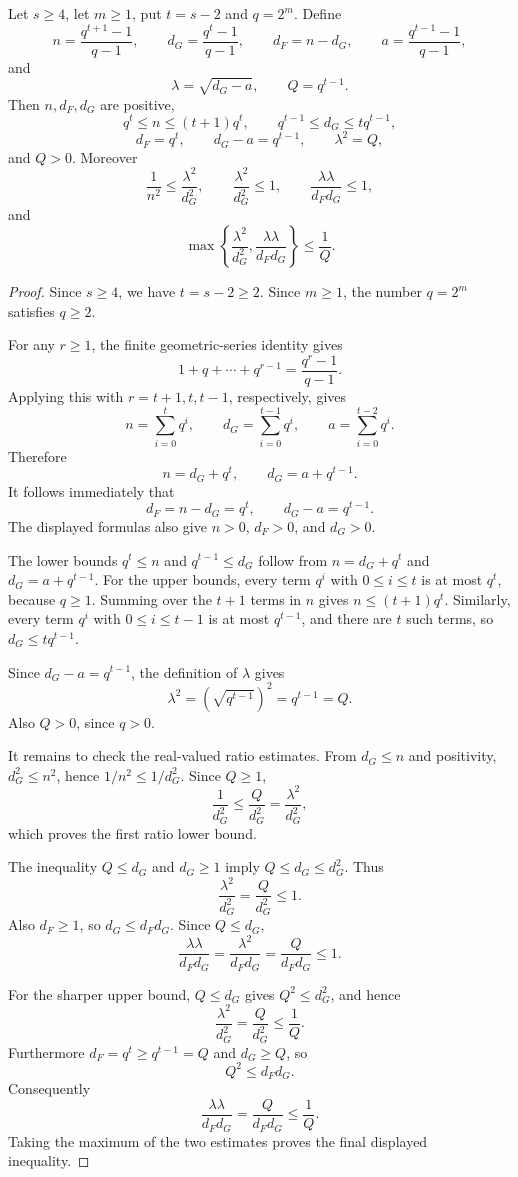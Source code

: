 \begin{helper}
Let \(s\ge4\), let \(m\ge1\), put \(t=s-2\) and \(q=2^m\).  Define
\[
  n=\frac{q^{t+1}-1}{q-1},\qquad
  d_G=\frac{q^t-1}{q-1},\qquad
  d_F=n-d_G,\qquad
  a=\frac{q^{t-1}-1}{q-1},
\]
and
\[
  \lambda=\sqrt{d_G-a},\qquad Q=q^{t-1}.
\]
Then \(n,d_F,d_G\) are positive,
\[
  q^t\le n\le (t+1)q^t,\qquad
  q^{t-1}\le d_G\le t q^{t-1},
\]
\[
  d_F=q^t,\qquad d_G-a=q^{t-1},\qquad \lambda^2=Q,
\]
and \(Q>0\).  Moreover
\[
  \frac1{n^2}\le \frac{\lambda^2}{d_G^2},\qquad
  \frac{\lambda^2}{d_G^2}\le 1,\qquad
  \frac{\lambda\lambda}{d_Fd_G}\le 1,
\]
and
\[
  \max\left\{\frac{\lambda^2}{d_G^2},
    \frac{\lambda\lambda}{d_Fd_G}\right\}\le \frac1Q.
\]
\end{helper}
\begin{proof}
Since \(s\ge4\), we have \(t=s-2\ge2\).  Since \(m\ge1\), the number
\(q=2^m\) satisfies \(q\ge2\).

For any \(r\ge1\), the finite geometric-series identity gives
\[
  1+q+\cdots+q^{r-1}=\frac{q^r-1}{q-1}.
\]
Applying this with \(r=t+1,t,t-1\), respectively, gives
\[
  n=\sum_{i=0}^{t}q^i,\qquad
  d_G=\sum_{i=0}^{t-1}q^i,\qquad
  a=\sum_{i=0}^{t-2}q^i.
\]
Therefore
\[
  n=d_G+q^t,\qquad d_G=a+q^{t-1}.
\]
It follows immediately that
\[
  d_F=n-d_G=q^t,\qquad d_G-a=q^{t-1}.
\]
The displayed formulas also give \(n>0\), \(d_F>0\), and \(d_G>0\).

The lower bounds \(q^t\le n\) and \(q^{t-1}\le d_G\) follow from
\(n=d_G+q^t\) and \(d_G=a+q^{t-1}\).  For the upper bounds, every term
\(q^i\) with \(0\le i\le t\) is at most \(q^t\), because \(q\ge1\).  Summing
over the \(t+1\) terms in \(n\) gives \(n\le(t+1)q^t\).  Similarly, every
term \(q^i\) with \(0\le i\le t-1\) is at most \(q^{t-1}\), and there are
\(t\) such terms, so \(d_G\le t q^{t-1}\).

Since \(d_G-a=q^{t-1}\), the definition of \(\lambda\) gives
\[
  \lambda^2=(\sqrt{q^{t-1}})^2=q^{t-1}=Q.
\]
Also \(Q>0\), since \(q>0\).

It remains to check the real-valued ratio estimates.  From \(d_G\le n\) and
positivity, \(d_G^2\le n^2\), hence \(1/n^2\le1/d_G^2\).  Since \(Q\ge1\),
\[
  \frac1{d_G^2}\le \frac{Q}{d_G^2}
    =\frac{\lambda^2}{d_G^2},
\]
which proves the first ratio lower bound.

The inequality \(Q\le d_G\) and \(d_G\ge1\) imply \(Q\le d_G\le d_G^2\).
Thus
\[
  \frac{\lambda^2}{d_G^2}=\frac{Q}{d_G^2}\le1.
\]
Also \(d_F\ge1\), so \(d_G\le d_Fd_G\).  Since \(Q\le d_G\),
\[
  \frac{\lambda\lambda}{d_Fd_G}
    =\frac{\lambda^2}{d_Fd_G}
    =\frac{Q}{d_Fd_G}\le1.
\]

For the sharper upper bound, \(Q\le d_G\) gives \(Q^2\le d_G^2\), and hence
\[
  \frac{\lambda^2}{d_G^2}
    =\frac{Q}{d_G^2}\le\frac1Q.
\]
Furthermore \(d_F=q^t\ge q^{t-1}=Q\) and \(d_G\ge Q\), so
\[
  Q^2\le d_Fd_G.
\]
Consequently
\[
  \frac{\lambda\lambda}{d_Fd_G}
    =\frac{Q}{d_Fd_G}\le\frac1Q.
\]
Taking the maximum of the two estimates proves the final displayed
inequality.
\end{proof}

